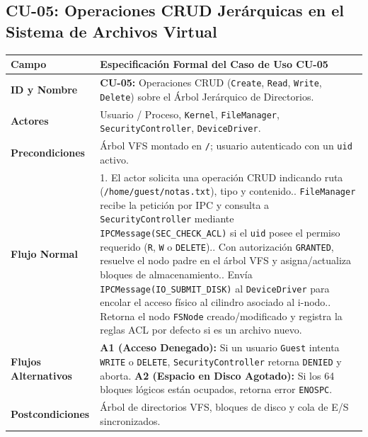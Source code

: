\documentclass[10pt,twocolumn,letterpaper]{article}
\begin{document}
\subsection{CU-05: Operaciones CRUD Jer\'arquicas en el Sistema de Archivos Virtual}
\begin{table}[!htb]
\centering
\scriptsize
\renewcommand{\arraystretch}{1.12}
\begin{tabularx}{\columnwidth}{L{2.1cm} Y}
\toprule
\textbf{Campo} & \textbf{Especificaci\'on Formal del Caso de Uso CU-05} \\
\midrule
\textbf{ID y Nombre} & \textbf{CU-05:} Operaciones CRUD (\texttt{Create}, \texttt{Read}, \texttt{Write}, \texttt{Delete}) sobre el \'Arbol Jer\'arquico de Directorios. \\
\textbf{Actores} & Usuario / Proceso, \texttt{Kernel}, \texttt{FileManager}, \texttt{SecurityController}, \texttt{DeviceDriver}. \\
\textbf{Precondiciones} & \'Arbol VFS montado en \texttt{/}; usuario autenticado con un \texttt{uid} activo. \\
\textbf{Flujo Normal} & 1. El actor solicita una operaci\'on CRUD indicando ruta (\texttt{/home/guest/notas.txt}), tipo y contenido.. \texttt{FileManager} recibe la petici\'on por IPC y consulta a \texttt{SecurityController} mediante \texttt{IPCMessage(SEC\_CHECK\_ACL)} si el \texttt{uid} posee el permiso requerido (\texttt{R}, \texttt{W} o \texttt{DELETE}).. Con autorizaci\'on \texttt{GRANTED}, resuelve el nodo padre en el \'arbol VFS y asigna/actualiza bloques de almacenamiento.. Env\'ia \texttt{IPCMessage(IO\_SUBMIT\_DISK)} al \texttt{DeviceDriver} para encolar el acceso f\'isico al cilindro asociado al i-nodo.. Retorna el nodo \texttt{FSNode} creado/modificado y registra la reglas ACL por defecto si es un archivo nuevo. \\
\textbf{Flujos Alternativos} & \textbf{A1 (Acceso Denegado):} Si un usuario \texttt{Guest} intenta \texttt{WRITE} o \texttt{DELETE}, \texttt{SecurityController} retorna \texttt{DENIED} y aborta.\newline
\textbf{A2 (Espacio en Disco Agotado):} Si los 64 bloques l\'ogicos est\'an ocupados, retorna error \texttt{ENOSPC}. \\
\textbf{Postcondiciones} & \'Arbol de directorios VFS, bloques de disco y cola de E/S sincronizados. \\
\bottomrule
\end{tabularx}
\end{table}
\end{document}
